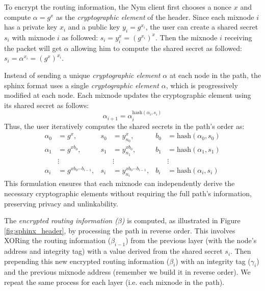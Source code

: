 To encrypt the routing information, the Nym client first chooses a nonce $x$ and compute $\alpha = g^x$ as the \textit{cryptographic element} of the header.
Since each mixnode $i$ has a private key $x_i$ and a public key $y_i = g^{x_i}$, the user can create a shared secret $s_i$ with mixnode $i$ as followed: $s_i = y_i^x = (g^{x_i})^x$. 
Then the mixnode $i$ receiving the packet will get $\alpha$ allowing him to compute the shared secret as followed: $s_i = \alpha^{x_i} = (g^x)^{x_i}$.

Instead of sending a unique \textit{cryptographic element $\alpha$} at each node in the path, the sphinx format uses a single \textit{cryptographic element $\alpha$}, which is progressively modified at each node. 
Each mixnode updates the cryptographic element using its shared secret as follows:  
$$\alpha_{i+1} = \alpha_i^{\text{hash}(\alpha_i, s_i)}$$
Thus, the user iteratively computes the shared secrets in the path's order as: 
$$
\begin{aligned}
    \alpha_0 &= g^{x}, & s_0 &= y_{n_0}^{x}, & b_0 &= \text{hash}(\alpha_0, s_0) \\
    \alpha_1 &= g^{x b_0}, & s_1 &= y_{n_1}^{x b_0}, & b_1 &= \text{hash}(\alpha_1, s_1) \\
    &\vdots & &\vdots & &\vdots \\
    \alpha_i &= g^{x b_0 \cdots b_{i-1}}, & s_i &= y_{n_i}^{x b_0 \cdots b_{i-1}}, & b_i &= \text{hash}(\alpha_i, s_i)
\end{aligned}
$$
This formulation ensures that each mixnode can independently derive the necessary cryptographic elements without requiring the full path’s information, preserving privacy and unlinkability.  
\newline

The \textit{encrypted routing information ($\beta$)} is computed, as illustrated in Figure \ref{fig:sphinx_header}, by processing the path in reverse order. 
This involves XORing the routing information ($\beta_{i-1}$) from the previous layer (with the node's address and integrity tag) with a value derived from the shared secret $s_i$. 
Then prepending this new encrypted routing information ($\beta_i$) with an integrity tag ($\gamma_i$) and the previous mixnode address (remember we build it in reverse order).
We repeat the same process for each layer (i.e. each mixnode in the path).

